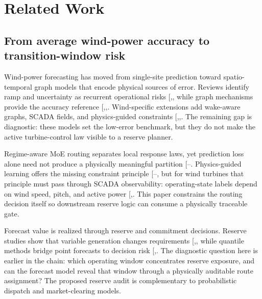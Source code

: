 \documentclass[
  11pt]{article}
\begin{document}
\section{Related Work}\label{related-work}

\subsection{From average wind-power accuracy to transition-window
risk}\label{from-average-wind-power-accuracy-to-transition-window-risk}

Wind-power forecasting has moved from single-site prediction toward
spatio-temporal graph models that encode physical sources of error.
Reviews identify ramp and uncertainty as recurrent operational risks
{[},\citeproc{ref-wang2025uncertaintyreview}{12}{]},
while graph mechanisms provide the accuracy reference
{[},,\citeproc{ref-bai2020agcrn}{14}{]}.
Wind-specific extensions add wake-aware graphs, SCADA fields, and
physics-guided constraints
{[},,\citeproc{ref-daenens2025offshore}{5}{]}.
The remaining gap is diagnostic: these models set the low-error
benchmark, but they do not make the active turbine-control law visible
to a reserve planner.

Regime-aware MoE routing separates local response laws, yet prediction
loss alone need not produce a physically meaningful partition
{[}--\citeproc{ref-shi2025timemoe}{10}{]}.
Physics-guided learning offers the missing constraint principle
{[}--\citeproc{ref-parsa2025pimlreview}{17}{]},
but for wind turbines that principle must pass through SCADA
observability: operating-state labels depend on wind speed, pitch, and
active power
{[},\citeproc{ref-zhou2024sdwpfdata}{19}{]}.
This paper constrains the routing decision itself so downstream reserve
logic can consume a physically traceable gate.

Forecast value is realized through reserve and commitment decisions.
Reserve studies show that variable generation changes requirements
{[},\citeproc{ref-ela2011operatingreserves}{21}{]},
while quantile methods bridge point forecasts to decision risk
{[},\citeproc{ref-zhang2014probabilisticreview}{23}{]}.
The diagnostic question here is earlier in the chain: which operating
window concentrates reserve exposure, and can the forecast model reveal
that window through a physically auditable route assignment? The
proposed reserve audit is complementary to probabilistic dispatch and
market-clearing models.
\end{document}
